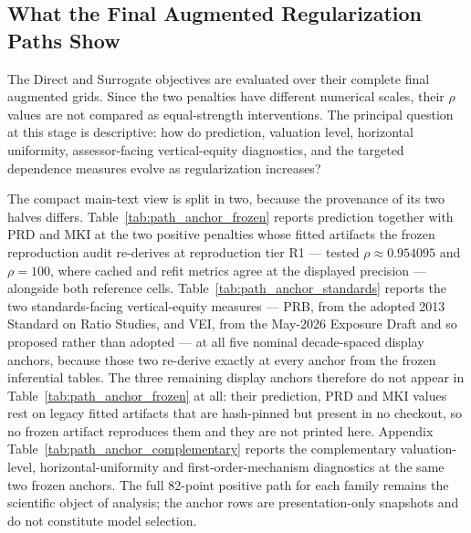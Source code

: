 \documentclass[10pt]{article}
\theoremstyle{definition}
\newcommand{\1}{\mathbf{1}}
\begin{document}
\subsection{\texorpdfstring{
What the Final Augmented Regularization Paths Show}{What the Final Augmented Regularization Paths Show}}
\label{subsec:path_results}

The Direct and Surrogate objectives are evaluated over their complete final augmented grids. Since the two penalties have different numerical scales, their
$\rho$ values are not compared as equal-strength interventions. The principal
question at this stage is descriptive: how do prediction, valuation level,
horizontal uniformity, assessor-facing vertical-equity diagnostics, and the targeted
dependence measures evolve as regularization increases?

The compact main-text view is split in two, because the provenance of its two
halves differs. Table~\ref{tab:path_anchor_frozen} reports prediction together with PRD and MKI at
the two positive penalties whose fitted artifacts the frozen reproduction audit re-derives at
reproduction tier R1 --- tested $\rho\approx 0.954095$ and $\rho=100$, where cached and refit metrics
agree at the displayed precision --- alongside both reference cells.
Table~\ref{tab:path_anchor_standards} reports the two standards-facing vertical-equity measures ---
PRB, from the adopted 2013 Standard on Ratio Studies, and VEI, from the May-2026 Exposure Draft and so
proposed rather than adopted --- at all five nominal decade-spaced display anchors, because those two
re-derive exactly at every anchor from the frozen inferential tables. The three remaining display anchors therefore do not
appear in Table~\ref{tab:path_anchor_frozen} at all: their prediction, PRD and MKI values rest on
legacy fitted artifacts that are hash-pinned but present in no checkout, so no frozen artifact
reproduces them and they are not printed here. Appendix
Table~\ref{tab:path_anchor_complementary} reports the complementary valuation-level,
horizontal-uniformity and first-order-mechanism diagnostics at the same two frozen anchors. The full
82-point positive path for each family remains the scientific object of analysis; the anchor rows are
presentation-only snapshots and do not constitute model selection.
\end{document}
